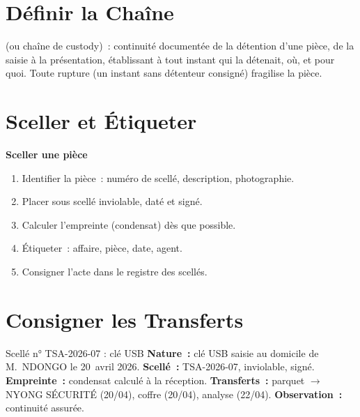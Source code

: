 \separateur

\section{Définir la Chaîne}
\label{sec:c05-definir}

\begin{boxdef}
 (ou chaîne de custody)~: continuité
documentée de la détention d'une pièce, de la saisie à la présentation,
établissant à tout instant qui la détenait, où, et pour quoi. Toute rupture
(un instant sans détenteur consigné) fragilise la pièce.
\end{boxdef}

\section{Sceller et Étiqueter}
\label{sec:c05-sceller}

\begin{boxprocedure}
\textbf{Sceller une pièce}
\begin{enumerate}
    \item Identifier la pièce~: numéro de scellé, description, photographie.
    \item Placer sous scellé inviolable, daté et signé.
    \item Calculer l'empreinte (condensat) dès que possible.
    \item Étiqueter~: affaire, pièce, date, agent.
    \item Consigner l'acte dans le registre des scellés.
\end{enumerate}
\end{boxprocedure}

\section{Consigner les Transferts}
\label{sec:c05-transferts}

\begin{boxobjet}{Scellé n° TSA-2026-07 : clé USB}
\textbf{Nature~:} clé USB saisie au domicile de M.~NDONGO le 20~avril 2026.
\textbf{Scellé~:} TSA-2026-07, inviolable, signé. \textbf{Empreinte~:}
condensat calculé à la réception. \textbf{Transferts~:} parquet $\to$ NYONG
SÉCURITÉ (20/04), coffre (20/04), analyse (22/04). \textbf{Observation~:}
continuité assurée.
\end{boxobjet}

